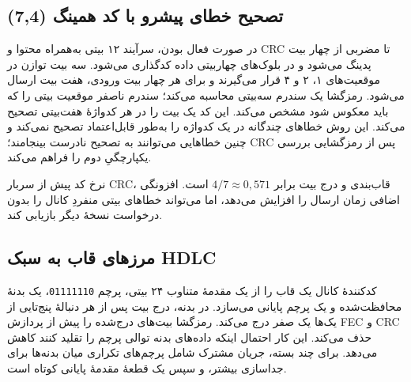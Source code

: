 \documentclass[12pt,a4paper]{article}
\providecommand{\lr}[1]{\foreignlanguage{english}{\begingroup\hyphenchar\font=-1 #1\endgroup}}
\newcommand{\code}[1]{\lr{\texttt{#1}}}
\begin{document}
\subsection{تصحیح خطای پیشرو با کد همینگ \lr{(7,4)}}
در صورت فعال بودن، سرآیند ۱۲ بیتی به‌همراه محتوا و \lr{CRC} تا مضربی از چهار بیت پدینگ می‌شود و در بلوک‌های چهاربیتی داده کدگذاری می‌شود. سه بیت توازن در موقعیت‌های ۱، ۲ و ۴ قرار می‌گیرند و برای هر چهار بیت ورودی، هفت بیت ارسال می‌شود. رمزگشا یک سندرم سه‌بیتی محاسبه می‌کند؛ سندرم ناصفر موقعیت بیتی را که باید معکوس شود مشخص می‌کند. این کد یک بیت را در هر کدواژۀ هفت‌بیتی تصحیح می‌کند. این روش خطاهای چندگانه در یک کدواژه را به‌طور قابل‌اعتماد تصحیح نمی‌کند و چنین خطاهایی می‌توانند به تصحیح نادرست بینجامند؛ \lr{CRC} پس از رمزگشایی بررسی یکپارچگیِ دوم را فراهم می‌کند.

نرخ کد پیش از سربار \lr{CRC}، قاب‌بندی و درج بیت برابر $4/7\approx0{,}571$ است. افزونگی اضافی زمان ارسال را افزایش می‌دهد، اما می‌تواند خطاهای بیتی منفردِ کانال را بدون درخواست نسخۀ دیگر بازیابی کند.

\subsection{مرزهای قاب به سبک \lr{HDLC}}
کدکنندۀ کانال یک قاب را از یک مقدمۀ متناوب ۲۴ بیتی، پرچم \code{01111110}، یک بدنۀ محافظت‌شده و یک پرچم پایانی می‌سازد. در بدنه، درج بیت پس از هر دنبالۀ پنج‌تایی از یک‌ها یک صفر درج می‌کند. رمزگشا بیت‌های درج‌شده را پیش از پردازش \lr{FEC} و \lr{CRC} حذف می‌کند. این کار احتمال اینکه داده‌های بدنه توالی پرچم را تقلید کنند کاهش می‌دهد. برای چند بسته، جریان مشترک شامل پرچم‌های تکراری میان بدنه‌ها برای جداسازی بیشتر، و سپس یک قطعۀ مقدمۀ پایانی کوتاه است.
\end{document}
